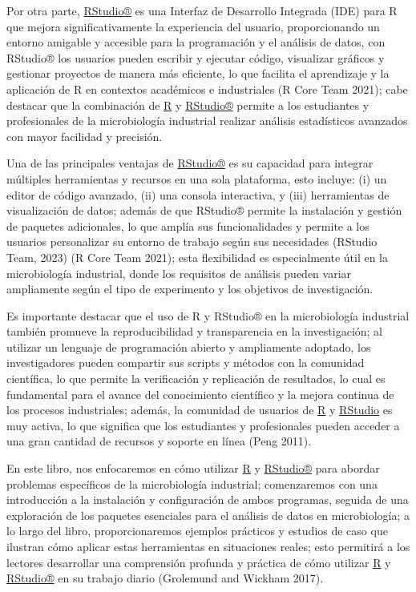 \documentclass[
  letterpaper,
  DIV=11,
  numbers=noendperiod]{scrreprt}
\begin{document}
Por otra parte,
\href{https://posit.co/download/rstudio-desktop/}{RStudio®} es una
Interfaz de Desarrollo Integrada (IDE) para R que mejora
significativamente la experiencia del usuario, proporcionando un entorno
amigable y accesible para la programación y el análisis de datos, con
RStudio® los usuarios pueden escribir y ejecutar código, visualizar
gráficos y gestionar proyectos de manera más eficiente, lo que facilita
el aprendizaje y la aplicación de R en contextos académicos e
industriales (R Core Team 2021); cabe destacar que la combinación de
\href{https://www.r-project.org/}{R} y
\href{https://posit.co/download/rstudio-desktop/}{RStudio®} permite a
los estudiantes y profesionales de la microbiología industrial realizar
análisis estadísticos avanzados con mayor facilidad y precisión.

Una de las principales ventajas de
\href{https://posit.co/download/rstudio-desktop/}{RStudio®} es su
capacidad para integrar múltiples herramientas y recursos en una sola
plataforma, esto incluye: (i) un editor de código avanzado, (ii) una
consola interactiva, y (iii) herramientas de visualización de datos;
además de que RStudio® permite la instalación y gestión de paquetes
adicionales, lo que amplía sus funcionalidades y permite a los usuarios
personalizar su entorno de trabajo según sus necesidades (RStudio Team,
2023) (R Core Team 2021); esta flexibilidad es especialmente útil en la
microbiología industrial, donde los requisitos de análisis pueden variar
ampliamente según el tipo de experimento y los objetivos de
investigación.

Es importante destacar que el uso de R y RStudio® en la microbiología
industrial también promueve la reproducibilidad y transparencia en la
investigación; al utilizar un lenguaje de programación abierto y
ampliamente adoptado, los investigadores pueden compartir sus scripts y
métodos con la comunidad científica, lo que permite la verificación y
replicación de resultados, lo cual es fundamental para el avance del
conocimiento científico y la mejora continua de los procesos
industriales; además, la comunidad de usuarios de
\href{https://www.r-project.org/}{R} y
\href{https://posit.co/download/rstudio-desktop/}{RStudio} es muy
activa, lo que significa que los estudiantes y profesionales pueden
acceder a una gran cantidad de recursos y soporte en línea (Peng 2011).

En este libro, nos enfocaremos en cómo utilizar
\href{https://www.r-project.org/}{R} y
\href{https://posit.co/download/rstudio-desktop/}{RStudio®} para abordar
problemas específicos de la microbiología industrial; comenzaremos con
una introducción a la instalación y configuración de ambos programas,
seguida de una exploración de los paquetes esenciales para el análisis
de datos en microbiología; a lo largo del libro, proporcionaremos
ejemplos prácticos y estudios de caso que ilustran cómo aplicar estas
herramientas en situaciones reales; esto permitirá a los lectores
desarrollar una comprensión profunda y práctica de cómo utilizar
\href{https://www.r-project.org/}{R} y
\href{https://posit.co/download/rstudio-desktop/}{RStudio®} en su
trabajo diario (Grolemund and Wickham 2017).
\end{document}
